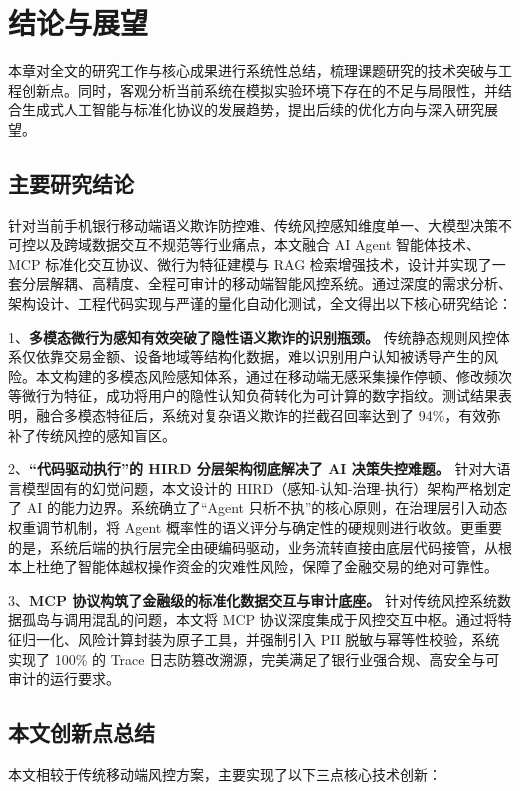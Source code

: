 \documentclass{xduugthesis}
\begin{document}
\chapter{结论与展望}

本章对全文的研究工作与核心成果进行系统性总结，梳理课题研究的技术突破与工程创新点。同时，客观分析当前系统在模拟实验环境下存在的不足与局限性，并结合生成式人工智能与标准化协议的发展趋势，提出后续的优化方向与深入研究展望。

\section{主要研究结论}

针对当前手机银行移动端语义欺诈防控难、传统风控感知维度单一、大模型决策不可控以及跨域数据交互不规范等行业痛点，本文融合 AI Agent 智能体技术、MCP 标准化交互协议、微行为特征建模与 RAG 检索增强技术，设计并实现了一套分层解耦、高精度、全程可审计的移动端智能风控系统。通过深度的需求分析、架构设计、工程代码实现与严谨的量化自动化测试，全文得出以下核心研究结论：

1、\textbf{多模态微行为感知有效突破了隐性语义欺诈的识别瓶颈。} 传统静态规则风控体系仅依靠交易金额、设备地域等结构化数据，难以识别用户认知被诱导产生的风险。本文构建的多模态风险感知体系，通过在移动端无感采集操作停顿、修改频次等微行为特征，成功将用户的隐性认知负荷转化为可计算的数字指纹。测试结果表明，融合多模态特征后，系统对复杂语义欺诈的拦截召回率达到了 94\%，有效弥补了传统风控的感知盲区。

2、\textbf{“代码驱动执行”的 HIRD 分层架构彻底解决了 AI 决策失控难题。} 针对大语言模型固有的幻觉问题，本文设计的 HIRD（感知-认知-治理-执行）架构严格划定了 AI 的能力边界。系统确立了“Agent 只析不执”的核心原则，在治理层引入动态权重调节机制，将 Agent 概率性的语义评分与确定性的硬规则进行收敛。更重要的是，系统后端的执行层完全由硬编码驱动，业务流转直接由底层代码接管，从根本上杜绝了智能体越权操作资金的灾难性风险，保障了金融交易的绝对可靠性。

3、\textbf{MCP 协议构筑了金融级的标准化数据交互与审计底座。} 针对传统风控系统数据孤岛与调用混乱的问题，本文将 MCP 协议深度集成于风控交互中枢。通过将特征归一化、风险计算封装为原子工具，并强制引入 PII 脱敏与幂等性校验，系统实现了 100\% 的 Trace 日志防篡改溯源，完美满足了银行业强合规、高安全与可审计的运行要求。

\section{本文创新点总结}

本文相较于传统移动端风控方案，主要实现了以下三点核心技术创新：
\end{document}
